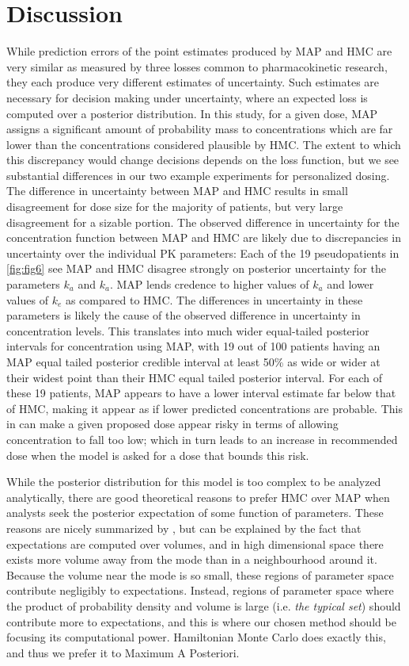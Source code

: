 \section{Discussion}

While prediction errors of the point estimates produced by MAP and HMC are very similar as measured by three losses common to pharmacokinetic research, they each produce very different estimates of uncertainty.  Such estimates are necessary for decision making under uncertainty, where an expected loss is computed over a posterior distribution.  In this study, for a given dose, MAP assigns a significant amount of probability mass to concentrations which are far lower than the concentrations considered plausible by HMC.  The extent to which this discrepancy would change decisions depends on the loss function, but we see substantial differences in our two example experiments for personalized dosing.  The difference in uncertainty between MAP and HMC results in small disagreement for dose size for the majority of patients, but very large disagreement for a sizable portion. The observed difference in uncertainty for the concentration function between MAP and HMC are likely due to discrepancies in uncertainty over the individual PK parameters: Each of the 19 pseudopatients in \cref{fig:fig6} see MAP and HMC disagree strongly on posterior uncertainty for the parameters $k_a$ and $k_a$.  MAP lends credence to higher values of $k_a$ and lower values of $k_e$ as compared to HMC. The differences in uncertainty in these parameters is likely the cause of the observed difference in uncertainty in concentration levels. This translates into much wider equal-tailed posterior intervals for concentration using MAP, with 19 out of 100 patients having an MAP equal tailed posterior credible interval at least 50\% as wide or wider at their widest point than their HMC equal tailed posterior interval. For each of these 19 patients, MAP appears to have a lower interval estimate far below that of HMC, making it appear as if lower predicted concentrations are probable. This in can make a given proposed dose appear risky in terms of allowing concentration to fall too low; which in turn leads to an increase in recommended dose when the model is asked for a dose that bounds this risk.

While the posterior distribution for this model is too complex to be analyzed analytically, there are good theoretical reasons to prefer HMC over MAP when analysts seek the posterior expectation of some function of parameters. These reasons are nicely summarized by \cite{Betancourt2017-ak}, but can be explained by the fact that expectations are computed over volumes, and in high dimensional space there exists more volume away from the mode than in a neighbourhood around it. Because the volume near the mode is so small, these regions of parameter space contribute negligibly to expectations.  Instead, regions of parameter space where the product of probability density and volume is large (i.e. \textit{the typical set}) should contribute more to expectations, and this is where our chosen method should be focusing its computational power.  Hamiltonian Monte Carlo does exactly this, and thus we prefer it to Maximum A Posteriori.

